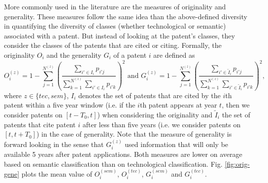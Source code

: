 \documentclass[10pt,A4,draft]{article}
\begin{document}
More commonly used in the literature are the measures of originality and generality. These measures follow the same idea than the above-defined diversity in quantifying the diversity of classes (whether technological or semantic) associated with a patent. But instead of looking at the patent's classes, they consider the classes of the patents that are cited or citing. Formally, the originality $O_i$ and the generality $G_i$ of a patent $i$ are defined as
\[
O_i^{(z)} = \displaystyle 1 - \sum_{j =1}^{N^{(z)}}{\left(\frac{\displaystyle \sum_{i' \in I_i}{p_{i'j}}}{\displaystyle \sum_{k =1}^{N^{(z)}}{\displaystyle \sum_{i' \in I_i}{p_{i'k}}}}\right)^2} \text{ and } G_i^{(z)} = \displaystyle 1 - \sum_{j =1}^{N^{(z)}}{\left(\frac{\displaystyle \sum_{i' \in \tilde{I}_i}{p_{i'j}}}{\displaystyle \sum_{k =1}^{N^{(z)}}{\displaystyle \sum_{i' \in \tilde{I}_i}{p_{i'k}}}}\right)^2}, 
\]
where $z \in \{tec, sem\}$, $I_i$ denotes the set of patents that are cited by the $i$th patent within a five year window (i.e. if the $i$th patent appears at year $t$, then we consider patents on $[t-T_0, t]$) when considering the originality and $\tilde{I}_i$ the set of patents that cite patent $i$ after less than five years (i.e. we consider patents on $[t ,t + T_0]$) in the case of generality. Note that the measure of generality is forward looking in the sense that $G_i^{(z)}$ used information that will only be available 5 years after patent applications. Both measures are lower on average based on semantic classification than on technological classification. Fig. \ref{fig:orig-gene} plots the mean value of $O_i^{(sem)}$, $O_i^{(tec)}$, $G_i^{(sem)}$ and $G_i^{(tec)}$.
\end{document}
